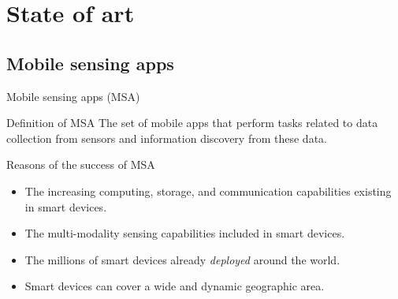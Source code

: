 \section{State of art}



\subsection{Mobile sensing apps}

\begin{frame}{Mobile sensing apps (MSA)}
  \begin{block}{Definition of MSA}
    The set of mobile apps that perform tasks related to data collection from sensors and information discovery from these data.
  \end{block}

  \begin{block}{Reasons of the success of MSA}
    \begin{itemize}
      \item The increasing computing, storage, and communication capabilities existing in smart devices.
      \item The multi-modality sensing capabilities included in smart devices.
      \item The millions of smart devices already \emph{deployed} around the world.
      \item Smart devices can cover a wide and dynamic geographic area.
    \end{itemize}
  \end{block}
\end{frame}


